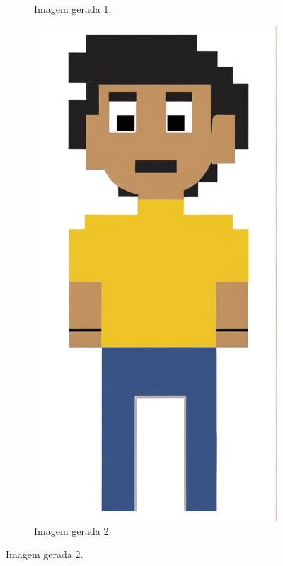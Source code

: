 \begin{figure}[htbp]
\begin{subfigure}{0.15\linewidth}
        \caption{\small Imagem gerada 1.}
        \label{fig:cgDreamJugger8a}
    \end{subfigure}
    \begin{subfigure}{0.15\linewidth}
        \includegraphics[width=1\linewidth]{figs/cgDream/res_img_jug8b.png}
        \caption{\small Imagem gerada 2.}
        \label{fig:cgDreamJugger8b}
    \end{subfigure}
\end{figure}

